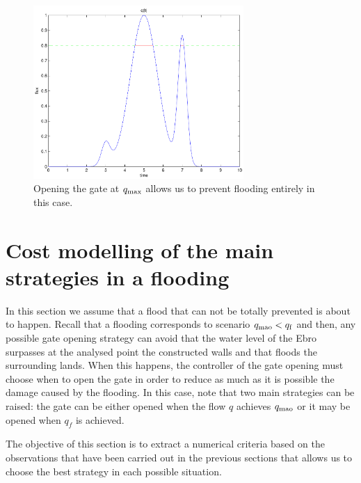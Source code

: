 \begin{figure} \centering
\includegraphics[width=8cm]{fig3}
\caption{Opening the gate at $q_{\mbox{\scriptsize max}}$ allows us to prevent flooding entirely in this case.}
\label{fig:3}
\end{figure}

\section{Cost modelling of the main strategies in a flooding} %
In this section we assume that a flood that can not be totally prevented is about to happen.
 Recall that a flooding  corresponds to scenario $q_{\mbox{\scriptsize mao}}<q_{\mbox{\scriptsize f}}$ and then, any possible gate opening strategy can avoid that the water level of the Ebro surpasses at the analysed point the constructed walls and that floods the surrounding lands. When this happens, the controller of the gate opening must choose when to open the gate in order to reduce as much as it is possible the damage caused by the flooding. In this case, note that two main strategies can be raised: the gate can be either opened when the flow $q$ achieves $q_{\mbox{\scriptsize mao}}$ or it may be opened when $q_f$ is achieved.

The objective of this section is to extract a numerical criteria based on the observations that have been carried out in the previous sections that allows us to choose the best strategy in each possible situation.


